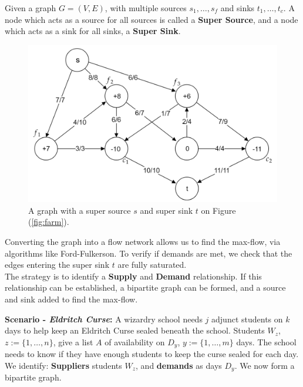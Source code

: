 \begin{Def}

    Given a graph $G=(V,E)$, with multiple sources $s_1,\dots,s_f$ and sinks $t_1,\dots,t_c$. A node 
    which acts as a source for all sources is called a \textbf{Super Source}, and a node which acts as a sink for all sinks, a \textbf{Super Sink}.
\end{Def}

\begin{figure}[h]
    \centering
    \includegraphics[width=.6\textwidth]{Sections/net/farmres.png}
    \caption{A graph with a super source $s$ and super sink $t$ on Figure (\ref{fig:farm}).}
\end{figure}

\vspace{-1em}
\noindent
Converting the graph into a flow network allows us to find the max-flow, via algorithms like Ford-Fulkerson. To verify
if demands are met, we check that the edges entering the super sink $t$ are fully saturated.\\

\noindent
The strategy is to identify a \textbf{Supply} and \textbf{Demand} relationship. If this relationship can be established, 
a bipartite graph can be formed, and a source and sink added to find the max-flow.

\newpage

\noindent
\textbf{Scenario - \textit{Eldritch Curse}:} A wizardry school needs $j$ adjunct students on 
$k$ days to help keep an Eldritch Curse sealed beneath the school. Students $W_z$, $z:=\{1,\dots,n\}$, give a list $A$ of availability on
$D_y$, $y:=\{1,\dots,m\}$ days. The school needs to know if they have enough students to keep the curse sealed for each day.\\

\noindent
We identify: \textbf{Suppliers} students $W_z$, and \textbf{demands} as days $D_y$. We now form a bipartite graph.

